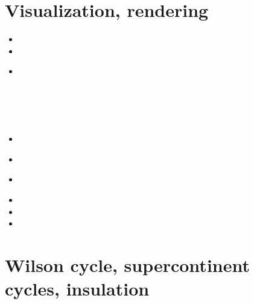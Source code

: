 \section{Visualization, rendering}

\begin{small}
\begin{itemize}
\item[\twothousandfour] 
\item[\twothousandfive] 
\item[\twothousandeight] 
 \\
 \\
 \\
 \\
 \\
\item[\twothousandtwelve] 
 \\
\item[\twothousandfifteen] 
\item[\twothousandseventeen] 
 \\
\item[\twothousandeighteen] 
\item[\twothousandnineteen] 
\item[\twothousandtwenty] 
\end{itemize}
\end{small}



\section{Wilson cycle, supercontinent cycles, insulation}

